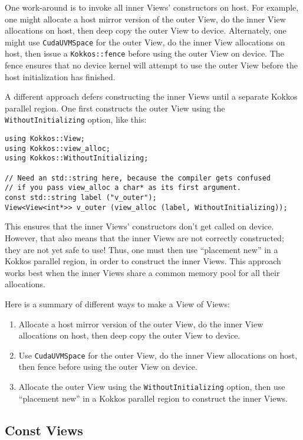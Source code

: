 One work-around is to invoke all inner Views' constructors on host.
For example, one might allocate a host mirror version of the outer
View, do the inner View allocations on host, then deep copy the outer
View to device.  Alternately, one might use \lstinline!CudaUVMSpace!
for the outer View, do the inner View allocations on host, then issue
a \lstinline!Kokkos::fence! before using the outer View on device.
The fence ensures that no device kernel will attempt to use the outer
View before the host initialization has finished.

A different approach defers constructing the inner Views until a
separate Kokkos parallel region.  One first constructs the outer View
using the \lstinline!WithoutInitializing! option, like this:
\begin{lstlisting}
using Kokkos::View;
using Kokkos::view_alloc;
using Kokkos::WithoutInitializing;

// Need an std::string here, because the compiler gets confused
// if you pass view_alloc a char* as its first argument.
const std::string label ("v_outer");
View<View<int*>> v_outer (view_alloc (label, WithoutInitializing));
\end{lstlisting}
This ensures that the inner Views' constructors don't get called on
device.  However, that also means that the inner Views are not
correctly constructed; they are not yet safe to use!  Thus, one must
then use ``placement new'' in a Kokkos parallel region, in order to
construct the inner Views.  This approach works best when the inner
Views share a common memory pool for all their allocations.

Here is a summary of different ways to make a View of Views:
\begin{enumerate}
\item Allocate a host mirror version of the outer View, do the inner
  View allocations on host, then deep copy the outer View to device.
\item Use \lstinline!CudaUVMSpace! for the outer View, do the inner
  View allocations on host, then fence before using the outer View on
  device.
\item Allocate the outer View using the
  \lstinline!WithoutInitializing! option, then use ``placement new''
  in a Kokkos parallel region to construct the inner Views.
\end{enumerate}


\subsection{Const Views}

